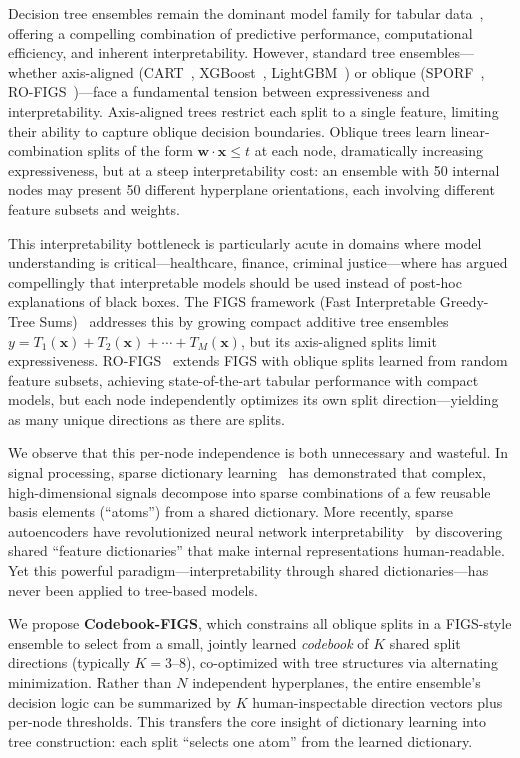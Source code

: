 \documentclass[11pt,letterpaper]{article}
\begin{document}
Decision tree ensembles remain the dominant model family for tabular data~\citep{Grinsztajn2022, Breiman2001, Hastie2009}, offering a compelling combination of predictive performance, computational efficiency, and inherent interpretability. However, standard tree ensembles---whether axis-aligned (CART~\citep{Breiman1984}, XGBoost~\citep{Chen2016}, LightGBM~\citep{Ke2017}) or oblique (SPORF~\citep{Tomita2020}, RO-FIGS~\citep{Mattikalli2025})---face a fundamental tension between expressiveness and interpretability. Axis-aligned trees restrict each split to a single feature, limiting their ability to capture oblique decision boundaries. Oblique trees learn linear-combination splits of the form $\mathbf{w} \cdot \mathbf{x} \leq t$ at each node, dramatically increasing expressiveness, but at a steep interpretability cost: an ensemble with 50 internal nodes may present 50 different hyperplane orientations, each involving different feature subsets and weights.

This interpretability bottleneck is particularly acute in domains where model understanding is critical---healthcare, finance, criminal justice---where \citet{Rudin2019} has argued compellingly that interpretable models should be used instead of post-hoc explanations of black boxes. The FIGS framework (Fast Interpretable Greedy-Tree Sums)~\citep{Tan2022} addresses this by growing compact additive tree ensembles $y = T_1(\mathbf{x}) + T_2(\mathbf{x}) + \cdots + T_M(\mathbf{x})$, but its axis-aligned splits limit expressiveness. RO-FIGS~\citep{Mattikalli2025} extends FIGS with oblique splits learned from random feature subsets, achieving state-of-the-art tabular performance with compact models, but each node independently optimizes its own split direction---yielding as many unique directions as there are splits.

We observe that this per-node independence is both unnecessary and wasteful. In signal processing, sparse dictionary learning~\citep{Aharon2006, Mairal2009} has demonstrated that complex, high-dimensional signals decompose into sparse combinations of a few reusable basis elements (``atoms'') from a shared dictionary. More recently, sparse autoencoders have revolutionized neural network interpretability~\citep{Cunningham2024} by discovering shared ``feature dictionaries'' that make internal representations human-readable. Yet this powerful paradigm---interpretability through shared dictionaries---has never been applied to tree-based models.

We propose \textbf{Codebook-FIGS}, which constrains all oblique splits in a FIGS-style ensemble to select from a small, jointly learned \emph{codebook} of $K$ shared split directions (typically $K = 3$--$8$), co-optimized with tree structures via alternating minimization. Rather than $N$ independent hyperplanes, the entire ensemble's decision logic can be summarized by $K$ human-inspectable direction vectors plus per-node thresholds. This transfers the core insight of dictionary learning into tree construction: each split ``selects one atom'' from the learned dictionary.
\end{document}
